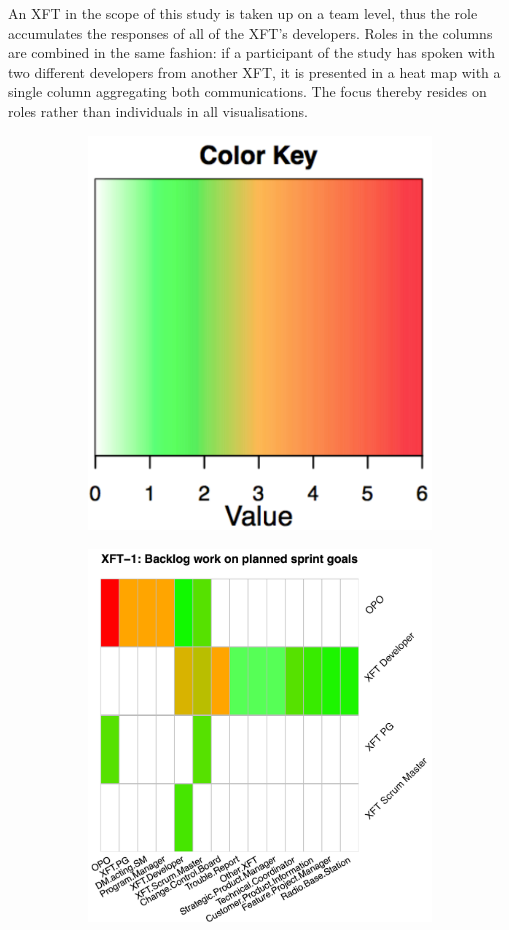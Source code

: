 An \ac{XFT} in the scope of this study is taken up on a team level, thus the  role accumulates the responses of all of the \ac{XFT}'s developers. Roles in the columns are combined in the same fashion: if a participant of the study has spoken with two different developers from another \ac{XFT}, it is presented in a heat map with a single  column aggregating both communications. The focus thereby resides on roles rather than individuals in all visualisations.

\begin{figure}
  \begin{subfigure}{.5\textwidth}
    \centering
    \includegraphics[width=.5\linewidth]{figures/heatmaps/colour-keys.pdf}
    \label{fig:hm-colourcodes}
  \end{subfigure}%
  \begin{subfigure}{.5\textwidth}
    \centering
    \includegraphics[width=.85\linewidth]{figures/heatmaps/ms2-_b_.pdf}

\end{subfigure}
\end{figure}
